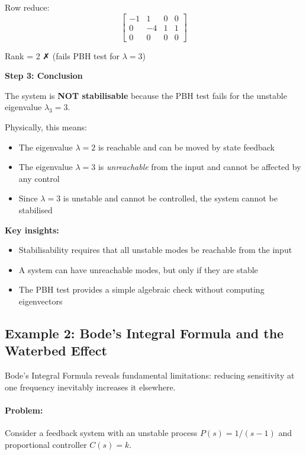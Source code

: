 \documentclass[11pt,a4paper]{article}
\begin{document}
Row reduce:
\begin{equation}
\begin{bmatrix} -1 & 1 & 0 & 0 \\ 0 & -4 & 1 & 1 \\ 0 & 0 & 0 & 0 \end{bmatrix}
\end{equation}

Rank = 2 ✗ (fails PBH test for $\lambda = 3$)

\textbf{Step 3: Conclusion}

The system is \textbf{NOT stabilisable} because the PBH test fails for the unstable eigenvalue $\lambda_3 = 3$.

Physically, this means:
\begin{itemize}
\item The eigenvalue $\lambda = 2$ is reachable and can be moved by state feedback
\item The eigenvalue $\lambda = 3$ is \emph{unreachable} from the input and cannot be affected by any control
\item Since $\lambda = 3$ is unstable and cannot be controlled, the system cannot be stabilised
\end{itemize}

\textbf{Key insights:}
\begin{itemize}
\item Stabilisability requires that all unstable modes be reachable from the input
\item A system can have unreachable modes, but only if they are stable
\item The PBH test provides a simple algebraic check without computing eigenvectors
\end{itemize}

\subsection{Example 2: Bode's Integral Formula and the Waterbed Effect}

Bode's Integral Formula reveals fundamental limitations: reducing sensitivity at one frequency inevitably increases it elsewhere.

\paragraph{Problem:}
Consider a feedback system with an unstable process $P(s) = 1/(s-1)$ and proportional controller $C(s) = k$. 
\end{document}
